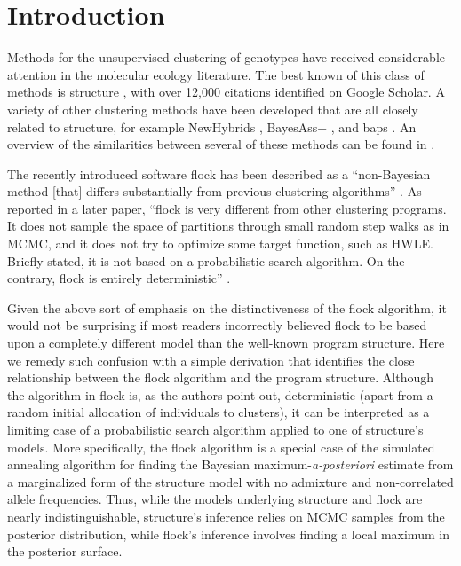 
\section*{Introduction}
Methods for the unsupervised clustering of genotypes have received 
considerable attention in the molecular ecology literature.  
The best known of this class of methods is {\sc structure} 
\citep{Pritchardetal2000}, with over 12,000 citations identified on 
Google Scholar.  A variety of other 
clustering methods have been developed that are all closely related to 
{\sc structure}, for example {\sc NewHybrids} \citep{And&Tho2002}, {\sc 
BayesAss+} \citep{Wil&Ran2003}, and {\sc baps} 
\citep{Coranderetal2004}. An overview of the similarities between several of these methods can be 
found in \citet{Anderson2009PGAC}.

The recently introduced software {\sc flock} \citep{Duc&Tur2009} has
been described
as a ``non-Bayesian method [that] 
differs substantially from previous 
clustering algorithms'' \citep[][p.~1333]{Duc&Tur2009}. As reported
in a later paper, ``{\sc flock} is very different from  other clustering 
programs. It does not sample the space of partitions through small 
random step walks as in MCMC, and it does not try to optimize some 
target function, such as HWLE\@. Briefly stated, it is not based on a 
probabilistic search algorithm. On the contrary, {\sc flock} is 
entirely deterministic'' \citep[][p.~736]{Duc&Tur2012}.

Given the above sort of emphasis on the distinctiveness of the {\sc flock}
algorithm, it would not be surprising if most readers incorrectly believed {\sc flock}
to be based upon a completely different model than the well-known program
{\sc structure}. Here we remedy such confusion with a simple derivation
that identifies 
the close relationship between the {\sc flock} algorithm and the program
{\sc structure}.  Although the algorithm in {\sc flock}
is, as the authors point out, deterministic (apart from a random initial allocation of 
individuals to clusters), it can be interpreted as a 
limiting case of a probabilistic search algorithm applied to one of {\sc structure}'s
models.  More specifically, the {\sc flock} 
algorithm is a special case of the simulated annealing
algorithm for finding the Bayesian maximum-{\em a-posteriori}
estimate from a marginalized form of the {\sc structure} model with no
admixture and non-correlated allele frequencies.  Thus, while the models underlying
{\sc structure} and {\sc flock} are nearly indistinguishable, {\sc structure}'s inference
relies on MCMC samples from the posterior distribution, while
{\sc flock}'s inference involves finding a local maximum in the posterior surface.

